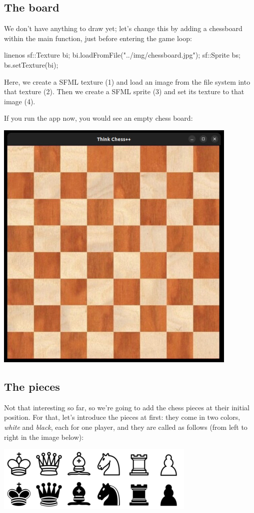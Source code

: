 \subsection{The board}
We don't have anything to draw yet; let's change this by adding a chessboard
within the main function, just before entering the game loop:

\begin{cpp*}{linenos}
  sf::Texture bi;
  bi.loadFromFile("../img/chessboard.jpg");
  sf::Sprite bs;
  bs.setTexture(bi);
\end{cpp*}

Here, we create a SFML texture (1) and load an image from the file system into that texture (2).
Then we create a SFML sprite (3) and set its texture  to that image (4).

If you run the app now, you would see an empty chess board:

\begin{center}
\includegraphics[width=.5\linewidth]{../img/emptyBoard.jpg}
\end{center}

\subsection{The pieces}
Not that interesting so far, so we're going to add the chess pieces at their initial position.
For that, let's introduce the pieces at first: they come in two colors, \emph{white}
and \emph{black}, each for one player, and they are called as follows
(from left to right in the image below):

\begin{center}
\includegraphics[width=.5\linewidth]{../img/figures.png}
\end{center}

